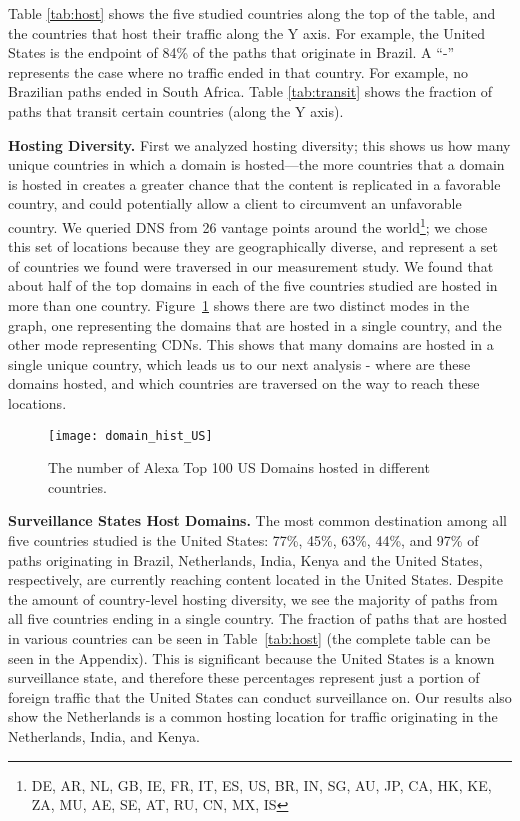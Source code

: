 Table \ref{tab:host} shows the five studied countries along the top of the table, and the countries that host their traffic along the Y axis.  For example, the United States is the endpoint of 84\% of the paths that originate in Brazil.  A ``-'' represents the case where no traffic ended in that country.  For example, no Brazilian paths ended in South Africa. Table \ref{tab:transit} shows the fraction of paths that transit certain countries (along the Y axis).

{\bf Hosting Diversity.}
First we analyzed hosting diversity; this shows us how many unique countries in which a domain is hosted---the more countries that a domain is hosted in creates a greater chance that the content is replicated in a favorable country, and could potentially allow a client to circumvent an unfavorable country.  We queried DNS from 26 vantage points around the world\footnote{DE, AR, NL, GB, IE, FR, IT, ES, US, BR, IN, SG, AU, JP, CA, HK, KE, ZA, MU, AE, SE, AT, RU, CN, MX, IS}; we chose this set of locations because they are geographically diverse, and represent a set of countries we found were traversed in our measurement study.  We found that about half of the top domains in each of the five countries studied are hosted in more than one country.  Figure~\ref{fig:host_diversity} shows there are two distinct modes in the graph, one representing the domains that are hosted in a single country, and the other mode representing CDNs.  This shows that many domains are hosted in a single unique country, which leads us to our next analysis - where are these domains hosted, and which countries are traversed on the way to reach these locations.

\begin{figure}
\centering
\texttt{[image: domain\_hist\_US]}
\caption{The number of Alexa Top 100 US Domains hosted in different countries.}
\label{fig:host_diversity}
\end{figure}

{\bf Surveillance States Host Domains.}
The most common destination among all five countries studied is the United States: 77\%, 45\%, 63\%, 44\%, and 97\% of paths originating in Brazil, Netherlands, India, Kenya and the United States, respectively, are currently reaching content located in the United States. Despite the amount of country-level hosting diversity, we see the majority of paths from all five countries ending in a single country.  The fraction of paths that are hosted in various countries can be seen in Table~\ref{tab:host} (the complete table can be seen in the Appendix).  This is significant because the United States is a known surveillance state, and therefore these percentages represent just a portion of foreign traffic that the United States can conduct surveillance on.  Our results also show the Netherlands is a common hosting location for traffic originating in the Netherlands, India, and Kenya.

